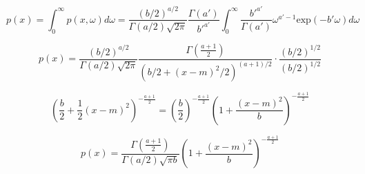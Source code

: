 \documentclass[12pt]{article}
\begin{document}
            \begin{equation}
                  p(x) = \int_0^{\infty}p(x, \omega) d\omega = \frac{(b/2)^{a/2}}{\Gamma(a/2) \sqrt{2\pi}} \frac{\Gamma(a')}{b'^{a'}} \int_0^{\infty} \frac{b'^{a'}}{\Gamma(a')}\omega^{a'-1} \text{exp}(-b' \omega) d\omega
            \end{equation}

            \begin{equation}
                  p(x) = \frac{(b/2)^{a/2}}{\Gamma(a/2) \sqrt{2\pi}} \frac{\Gamma(\frac{a+1}{2})}{(b/2 + (x-m)^2/2)^{(a+1)/2}} \cdot \frac{(b/2)^{1/2}}{(b/2)^{1/2}}
            \end{equation}

            \begin{equation}
                  \left( \frac{b}{2} + \frac{1}{2} (x-m)^2\right)^{-\frac{a+1}{2}} = \left (\frac{b}{2} \right)^{-\frac{a+1}{2}} \left( 1 + \frac{(x-m)^2}{b} \right)^{-\frac{a+1}{2}}
            \end{equation}

            \begin{equation}
                  p(x) = \frac{\Gamma \left( \frac{a+1}{2}\right)}{\Gamma(a/2)\sqrt{\pi b}} \left (1 + \frac{(x-m)^2}{b}\right)^{-\frac{a+1}{2}}
            \end{equation}
\end{document}
